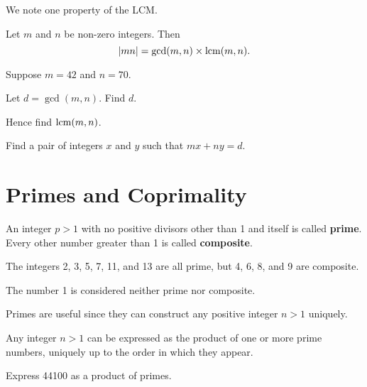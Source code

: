 We note one property of the LCM.
\begin{proposition}\label{prop-product-of-gcd-and-lcm}
    Let $m$ and $n$ be non-zero integers. Then
    \[
        |mn| = \gcd(m,n) \times \mathrm{lcm}(m,n).
    \]
\end{proposition}

\begin{exercise}
    Suppose $m = 42$ and $n = 70$.
    \begin{partquestions}{\roman*}
        \item Let $d = \gcd(m,n)$. Find $d$.
        \item Hence find $\mathrm{lcm}(m,n)$.
        \item Find a pair of integers $x$ and $y$ such that $mx + ny = d$.
    \end{partquestions}
\end{exercise}

\section{Primes and Coprimality}
\begin{definition}\label{definition-prime-number}
    An integer $p > 1$ with no positive divisors other than 1 and itself is called \textbf{prime}. Every other number greater than 1 is called \textbf{composite}.
\end{definition}
\begin{example}
    The integers 2, 3, 5, 7, 11, and 13 are all prime, but 4, 6, 8, and 9 are composite.
\end{example}
\begin{remark}
    The number 1 is considered neither prime nor composite.
\end{remark}

Primes are useful since they can construct any positive integer $n>1$ uniquely.

\begin{theorem}\label{thrm-fundamental-theorem-of-arithmetic}
    Any integer $n > 1$ can be expressed as the product of one or more prime numbers, uniquely up to the order in which they appear.
\end{theorem}

\begin{exercise}
    Express 44100 as a product of primes.
\end{exercise}

